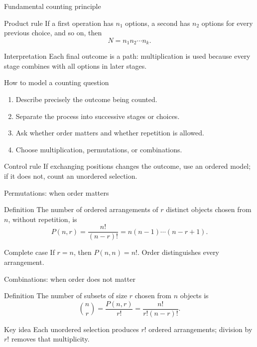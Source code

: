 \documentclass[10pt,aspectratio=169]{beamer}
\begin{document}
\begin{frame}{Fundamental counting principle}
  \small
  \begin{block}{Product rule}
    If a first operation has $n_1$ options, a second has $n_2$ options for
    every previous choice, and so on, then
    \[
      N=n_1n_2\cdots n_k.
    \]
  \end{block}
  \pause
  \begin{exampleblock}{Interpretation}
    Each final outcome is a path: multiplication is used because every stage
    combines with all options in later stages.
  \end{exampleblock}
\end{frame}

\begin{frame}{How to model a counting question}
  \footnotesize
  \begin{enumerate}\itemsep=0.12cm
    \item Describe precisely the outcome being counted.
    \item Separate the process into successive stages or choices.
    \item Ask whether order matters and whether repetition is allowed.
    \item Choose multiplication, permutations, or combinations.
  \end{enumerate}
  \vspace{0.1cm}
  \begin{alertblock}{Control rule}
    If exchanging positions changes the outcome, use an ordered model; if it
    does not, count an unordered selection.
  \end{alertblock}
\end{frame}

\begin{frame}{Permutations: when order matters}
  \small
  \begin{block}{Definition}
    The number of ordered arrangements of $r$ distinct objects chosen from
    $n$, without repetition, is
    \[
      P(n,r)=\frac{n!}{(n-r)!}=n(n-1)\cdots(n-r+1).
    \]
  \end{block}
  \begin{exampleblock}{Complete case}
    If $r=n$, then $P(n,n)=n!$. Order distinguishes every arrangement.
  \end{exampleblock}
\end{frame}

\begin{frame}{Combinations: when order does not matter}
  \small
  \begin{block}{Definition}
    The number of subsets of size $r$ chosen from $n$ objects is
    \[
      \binom{n}{r}=\frac{P(n,r)}{r!}=\frac{n!}{r!(n-r)!}.
    \]
  \end{block}
  \begin{exampleblock}{Key idea}
    Each unordered selection produces $r!$ ordered arrangements; division by
    $r!$ removes that multiplicity.
  \end{exampleblock}
\end{frame}
\end{document}
